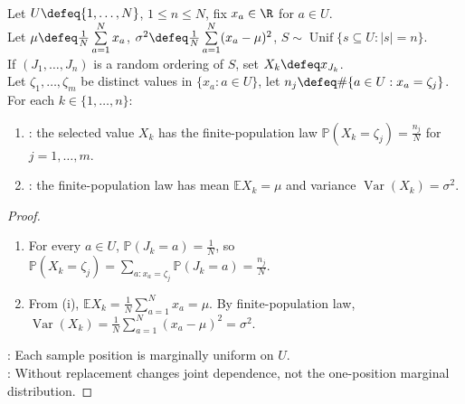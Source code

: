 \begin{lemma} \label{lem:srs-one-draw-law} \\
Let $U\defeq\{1,\ldots,N\}$, $1\leq n\leq N$, fix $x_a\in\R$ for $a\in U$.\\
Let $\mu\defeq \frac{1}{N}\sum\limits_{a=1}^{N}x_a$, $\sigma^2\defeq \frac{1}{N}\sum\limits_{a=1}^{N}(x_a-\mu)^2$, $S\sim\operatorname{Unif}\{s\subseteq U:|s|=n\}$.\\
If $(J_1,\ldots,J_n)$ is a random ordering of $S$, set $X_k\defeq x_{J_k}$.\\
Let $\zeta_1,\ldots,\zeta_m$ be distinct values in $\{x_a:a\in U\}$, let $n_j\defeq\#\{a\in U:x_a=\zeta_j\}$. For each $k\in\{1,\ldots,n\}$:
\begin{enumerate}[label=(\roman*)]
\setlength{\itemsep}{0pt}
\item {}: the selected value $X_k$ has the finite-population law $\mathbb{P}(X_k=\zeta_j)=\frac{n_j}{N}$ for $j=1,\ldots,m$.
\item {}: the finite-population law has mean $\mathbb{E}X_k=\mu$ and variance $\operatorname{Var}(X_k)=\sigma^2$.
\end{enumerate}
\begin{proof}
\begin{enumerate}[label=(\roman*)]
\setlength{\itemsep}{0pt}
\item For every $a\in U$, $\mathbb{P}(J_k=a)=\frac{1}{N}$, so $\mathbb{P}(X_k=\zeta_j)=\sum\limits_{a:x_a=\zeta_j}\mathbb{P}(J_k=a)=\frac{n_j}{N}$.
\item From (i), $\mathbb{E}X_k=\frac{1}{N}\sum\limits_{a=1}^{N}x_a=\mu$. By finite-population law, $\operatorname{Var}(X_k)=\frac{1}{N}\sum\limits_{a=1}^{N}(x_a-\mu)^2=\sigma^2$.
\end{enumerate}
: Each sample position is marginally uniform on $U$.\\
: Without replacement changes joint dependence, not the one-position marginal distribution.
\end{proof}
\end{lemma}

